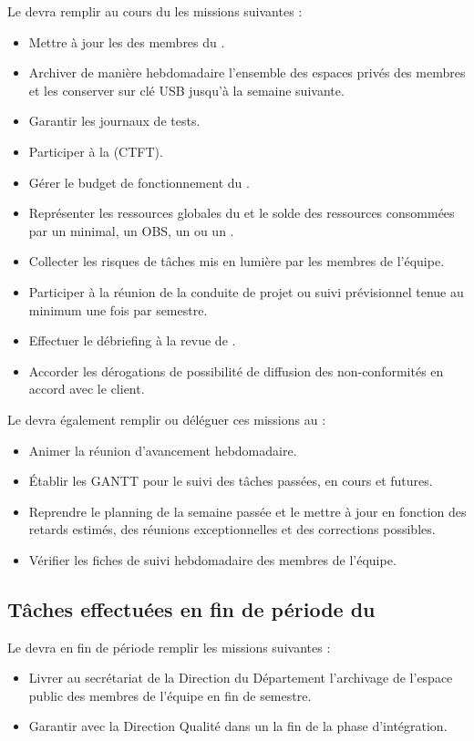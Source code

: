 Le \CP devra remplir au cours du \PICCourt les missions suivantes :

\begin{itemize}
	\item Mettre à jour les \FC des membres du \PICCourt.
	\item Archiver de manière hebdomadaire l’ensemble des espaces privés des membres et les conserver sur clé USB jusqu’à la semaine suivante.
	\item Garantir les journaux de tests.
	\item Participer à la \CTFT (CTFT).
	\item Gérer le budget de fonctionnement du \PICCourt.
	\item Représenter les ressources globales du \PICCourt et le solde des ressources consommées par un \WBSCourt minimal, un OBS, un \RBSCourt ou un \FBSCourt.
	\item Collecter les risques de tâches mis en lumière par les membres de l’équipe.
	\item Participer à la réunion de la conduite de projet ou suivi prévisionnel tenue au minimum une fois par semestre.
	\item Effectuer le débriefing à la revue de \PICCourt.
	\item Accorder les dérogations de possibilité de diffusion des non-conformités en accord avec le client.
\end{itemize}

Le \CP devra également remplir ou déléguer ces missions au \CPA :
\begin{itemize}
	\item Animer la réunion d’avancement hebdomadaire.
	\item Établir les GANTT pour le suivi des tâches passées, en cours et futures.
	\item Reprendre le planning de la semaine passée et le mettre à jour en fonction des retards estimés, des réunions exceptionnelles et des corrections possibles.
	\item Vérifier les fiches de suivi hebdomadaire des membres de l’équipe.
\end{itemize}

\subsection*{Tâches effectuées en fin de période du \PICCourt}

Le \CP devra en fin de période remplir les missions suivantes :
\begin{itemize}
	\item Livrer au secrétariat de la Direction du Département \ASICourt l’archivage de l’espace public des membres de l’équipe en fin de semestre.
	\item Garantir avec la Direction Qualité dans un \PVCourt la fin de la phase d’intégration.
\end{itemize}
\newpage

